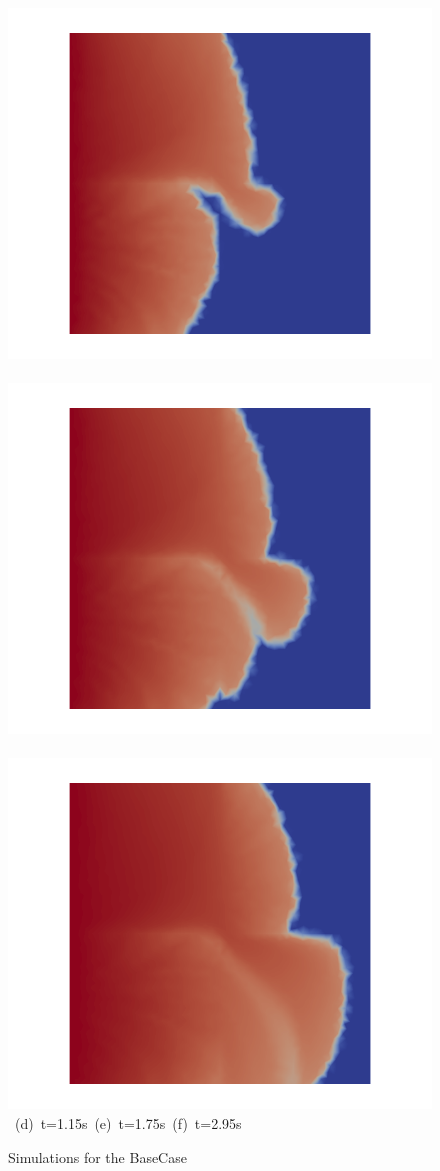 \begin{landscape}
\begin{figure}[ht]
{\hbox{
      \includegraphics[width=.56\textwidth]{./Pics/BaseCase/BaseCase_Saturation_t_1dot15.png}
      \includegraphics[width=.56\textwidth]{./Pics/BaseCase/BaseCase_Saturation_t_1dot75.png} 
      \includegraphics[width=.56\textwidth]{./Pics/BaseCase/BaseCase_Saturation_t_2dot95.png}}
\vspace{0.cm}
\hbox{ \hspace{2.5cm} (d) t=1.15s \hspace{5.5cm} (e) t=1.75s   \hspace{5.5cm} (f) t=2.95s}
\vspace{0.cm}
}   
\caption{Simulations for the BaseCase}
\label{fig:BaseCase_Saturation}
\end{figure}
\end{landscape}
\clearpage


